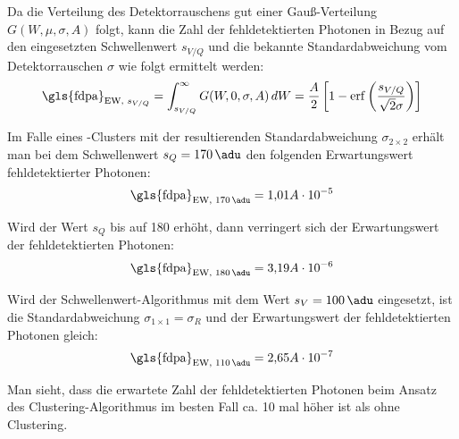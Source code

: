 \noindent
Da die Verteilung des Detektorrauschens gut einer Gauß-Verteilung $G(W, \mu, \sigma, A)$ folgt, kann die Zahl der fehldetektierten Photonen in Bezug auf den eingesetzten Schwellenwert $s_{V/Q}$ und die bekannte Standardabweichung vom Detektorrauschen $\sigma$ wie folgt ermittelt werden: 
\begin{equation}
    \text{\gls{fdpa}}_{\text{EW, $s_{V/Q}$}}=\int_{s_{V/Q}}^\infty G(W, 0, \sigma, A) \,dW = \frac{A}{2}\left[1 - \erf\left({\frac{s_{V/Q}}{\sqrt{2}\sigma}}\right)\right]
\end{equation}

\noindent
Im Falle eines -Clusters mit der resultierenden Standardabweichung $\sigma_{2\times 2}$ erhält man bei dem Schwellenwert $s_Q = \SI{170}{\adu}$ den folgenden Erwartungswert fehldetektierter Photonen:
\begin{equation}
     \text{\gls{fdpa}}_{\text{EW, \SI{170}{\adu}}} = 1{,}01A\cdot 10^{-5} %
\end{equation}

\noindent
Wird der Wert $s_Q$ bis auf \SI{180}{\adu} erhöht, dann verringert sich der Erwartungswert der fehldetektierten Photonen:
\begin{equation}
    \text{\gls{fdpa}}_{\text{EW, \SI{180}{\adu}}} = 3{,}19A\cdot 10^{-6} %
\end{equation}

\noindent
Wird der Schwellenwert-Algorithmus mit dem Wert $s_V = \SI{100}{\adu}$ eingesetzt, ist die Standardabweichung $\sigma_{1\times 1} = \sigma_{R}$ und der Erwartungswert der fehldetektierten Photonen gleich:
\begin{equation}
   \text{\gls{fdpa}}_{\text{EW, \SI{110}{\adu}}} = 2{,}65A\cdot 10^{-7} %
\end{equation}

\noindent
Man sieht, dass die erwartete Zahl der fehldetektierten Photonen beim Ansatz des Clustering-Al\-go\-rith\-mus im besten Fall ca. 10 mal höher ist als ohne Clustering. 

